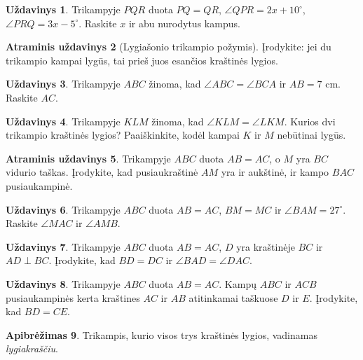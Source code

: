 \documentclass[12pt,a4paper,reqno]{amsart}
\newcommand{\krastineszymek}[1]{\tikz[baseline=(current bounding box.center)]{\foreach \x in {#1}{\draw (\x pt,-2.5pt)--(\x pt,2.5pt);}}}
\theoremstyle{plain}\newtheorem{theorem}{Teorema}[section]
\theoremstyle{definition}
\newtheorem{definition}[theorem]{Apibrėžimas}\newtheorem{fact}[theorem]{Faktas}\newtheorem{example}[theorem]{Pavyzdys}\newtheorem{algorithm}[theorem]{Algoritmas}\newtheorem{question}[theorem]{Klausimas}\newtheorem{exercise}[theorem]{Pratimas}\newtheorem{problem}[theorem]{Uždavinys}\newtheorem{anchorproblem}[theorem]{Atraminis uždavinys}
\theoremstyle{remark}\newtheorem{remark}[theorem]{Pastaba}\newtheorem*{remark*}{Pastaba}
\theoremstyle{definition}\newtheorem*{problem*}{Uždavinys}
\begin{document}
\begin{problem}\label{uzd:lygias-kampai-02} Trikampyje $PQR$ duota $PQ=QR$, $\angle QPR=2x+10^\circ$, $\angle PRQ=3x-5^\circ$. Raskite $x$ ir abu nurodytus kampus. \end{problem}
\begin{anchorproblem}[Lygiašonio trikampio požymis]\label{atr:lygias-atvirkstine} Įrodykite: jei du trikampio kampai lygūs, tai prieš juos esančios kraštinės lygios. \end{anchorproblem}
\begin{problem}\label{uzd:lygias-atvirkstine-01} Trikampyje $ABC$ žinoma, kad $\angle ABC=\angle BCA$ ir $AB=7$ cm. Raskite $AC$. \end{problem}
\begin{problem}\label{uzd:lygias-atvirkstine-02} Trikampyje $KLM$ žinoma, kad $\angle KLM=\angle LKM$. Kurios dvi trikampio kraštinės lygios? Paaiškinkite, kodėl kampai $K$ ir $M$ nebūtinai lygūs. \end{problem}
\begin{anchorproblem}\label{atr:lygias-pusiaukrastine} Trikampyje $ABC$ duota $AB=AC$, o $M$ yra $BC$ vidurio taškas. Įrodykite, kad pusiaukraštinė $AM$ yra ir aukštinė, ir kampo $BAC$ pusiaukampinė. \end{anchorproblem}
\begin{problem}\label{uzd:lygias-pusiaukrastine-01} Trikampyje $ABC$ duota $AB=AC$, $BM=MC$ ir $\angle BAM=27^\circ$. Raskite $\angle MAC$ ir $\angle AMB$. \end{problem}
\begin{problem}\label{uzd:lygias-aukstine-01} Trikampyje $ABC$ duota $AB=AC$, $D$ yra kraštinėje $BC$ ir $AD\perp BC$. Įrodykite, kad $BD=DC$ ir $\angle BAD=\angle DAC$. \end{problem}
\begin{problem}\label{uzd:lygias-pusiaukampines-01} Trikampyje $ABC$ duota $AB=AC$. Kampų $ABC$ ir $ACB$ pusiaukampinės kerta kraštines $AC$ ir $AB$ atitinkamai taškuose $D$ ir $E$. Įrodykite, kad $BD=CE$. \end{problem}
\begin{definition}\label{apib:lygiakrastis} Trikampis, kurio visos trys kraštinės lygios, vadinamas \emph{lygiakraščiu}.
\begin{center}
\end{center}
\end{definition}
\end{document}
